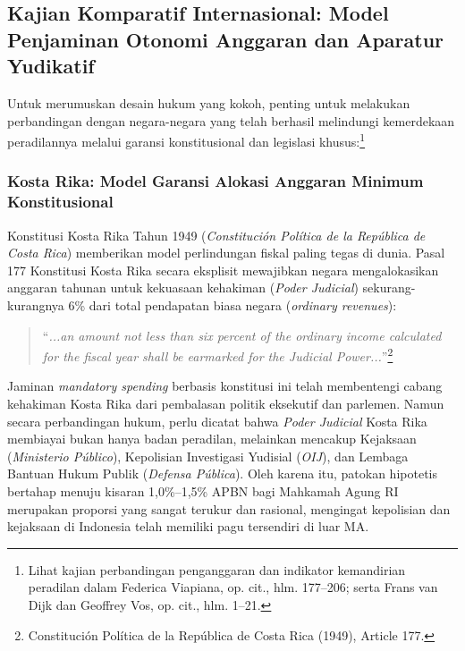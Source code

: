 \documentclass[12pt,a4paper,twocolumn]{article}
\begin{document}
\subsection{Kajian Komparatif Internasional: Model Penjaminan Otonomi Anggaran dan Aparatur Yudikatif}

Untuk merumuskan desain hukum yang kokoh, penting untuk melakukan perbandingan dengan negara-negara yang telah berhasil melindungi kemerdekaan peradilannya melalui garansi konstitusional dan legislasi khusus:\footnote{Lihat kajian perbandingan penganggaran dan indikator kemandirian peradilan dalam Federica Viapiana, op. cit., hlm. 177--206; serta Frans van Dijk dan Geoffrey Vos, op. cit., hlm. 1--21.}

\subsubsection{Kosta Rika: Model Garansi Alokasi Anggaran Minimum Konstitusional}
Konstitusi Kosta Rika Tahun 1949 (\textit{Constitución Política de la República de Costa Rica}) memberikan model perlindungan fiskal paling tegas di dunia. Pasal 177 Konstitusi Kosta Rika secara eksplisit mewajibkan negara mengalokasikan anggaran tahunan untuk kekuasaan kehakiman (\textit{Poder Judicial}) sekurang-kurangnya 6\% dari total pendapatan biasa negara (\textit{ordinary revenues}):
\begin{quote}
    ``\textit{...an amount not less than six percent of the ordinary income calculated for the fiscal year shall be earmarked for the Judicial Power...}''\footnote{Constitución Política de la República de Costa Rica (1949), Article 177.}
\end{quote}
Jaminan \textit{mandatory spending} berbasis konstitusi ini telah membentengi cabang kehakiman Kosta Rika dari pembalasan politik eksekutif dan parlemen. Namun secara perbandingan hukum, perlu dicatat bahwa \textit{Poder Judicial} Kosta Rika membiayai bukan hanya badan peradilan, melainkan mencakup Kejaksaan (\textit{Ministerio P\'{u}blico}), Kepolisian Investigasi Yudisial (\textit{OIJ}), dan Lembaga Bantuan Hukum Publik (\textit{Defensa P\'{u}blica}). Oleh karena itu, patokan hipotetis bertahap menuju kisaran 1,0\%--1,5\% APBN bagi Mahkamah Agung RI merupakan proporsi yang sangat terukur dan rasional, mengingat kepolisian dan kejaksaan di Indonesia telah memiliki pagu tersendiri di luar MA.
\end{document}
